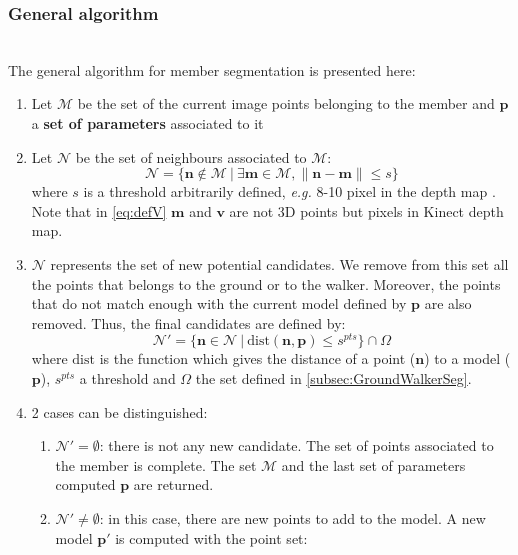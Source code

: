 \documentclass[letterpaper, 10 pt, conference]{ieeeconf}
\newcommand{\CDOK}[2]{{#1}} %
\begin{document}
\subsubsection{General algorithm}~\\
\label{subsub:generalAlgo}
The general algorithm for member segmentation is presented here:
\begin{enumerate}
	\item Let $\mathcal{M}$ be the set of the current image points belonging to the member and $\mathbf{p}$ a \textbf{set of parameters} associated to it
	\item Let $\mathcal{N}$ be the set of neighbours associated to $\mathcal{M}$:
	\begin{equation}
		\mathcal{N} = \{\mathbf{n}\notin\mathcal{M}\ |\ \exists \mathbf{m}\in\mathcal{M}, \|\mathbf{n} - \mathbf{m}\| \leq s \}
		\label{eq:defV}
	\end{equation}
	where $s$ is a threshold \CDOK{arbitrarily defined, \textit{e.g.} 8-10 pixel in the depth map }{to define (8-10 pixels)}. Note that in \eqref{eq:defV} $\mathbf{m}$ and $\mathbf{v}$ are not 3D points but pixels in Kinect \CDOK{depth map}{image}.
	\item $\mathcal{N}$ represents the set of new potential candidates. We remove from this set all the points that belongs to the ground or to the walker. Moreover, the points that do not match enough with the current model defined by $\mathbf{p}$ are also removed. Thus, the final candidates are defined by:
	\begin{equation}
		\mathcal{N}' = \{\mathbf{n}\in\mathcal{N}\ |\ \mathrm{dist(\mathbf{n},\mathbf{p})}\leq s^{pts}\}\cap\Omega
	\end{equation}
	where $\mathrm{dist}$ is the function which gives the distance of a point ($\mathbf{n}$) to a model ($\mathbf{p}$), $s^{pts}$ a threshold and $\Omega$ the set defined in \ref{subsec:GroundWalkerSeg}.
	\item 2 cases can be distinguished:
	\begin{enumerate}
		\item $\mathcal{N}'=\emptyset$: there is not any new candidate. The set of points associated to the member is complete. The set $\mathcal{M}$ and the last set of parameters computed $\mathbf{p}$ are returned.
		\item $\mathcal{N}'\neq\emptyset$: in this case, there are new points to add to the model. A new model $\mathbf{p'}$ is computed with the point set:
		\begin{equation}

\end{equation}
\end{enumerate}
\end{enumerate}
\end{document}
